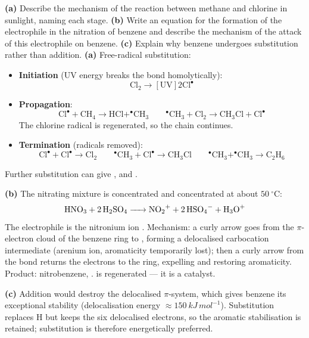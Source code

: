 \documentclass[11pt]{article}
\newcommand{\cle}[1]{{\popxbold\color{popdark}#1}}
\begin{document}
\begin{exoresolu}
\textbf{(a)} Describe the mechanism of the reaction between methane and chlorine in sunlight, naming each stage. \textbf{(b)} Write an equation for the formation of the electrophile in the nitration of benzene and describe the mechanism of the attack of this electrophile on benzene. \textbf{(c)} Explain why benzene undergoes substitution rather than addition.
\tcblower
\textbf{(a)} Free-radical substitution:
\begin{itemize}
\item \textbf{Initiation} (UV energy breaks the  bond homolytically):
\[ \ensuremath{\mathrm{Cl_{2} \rightarrow [UV] 2Cl^{\bullet}}} \]
\item \textbf{Propagation}:
\[ \ensuremath{\mathrm{Cl^{\bullet} + CH_{4} \rightarrow  HCl + ^{\bullet}CH_{3}}} \qquad \ensuremath{\mathrm{^{\bullet}CH_{3} + Cl_{2} \rightarrow  CH_{3}Cl + Cl^{\bullet}}} \]
The chlorine radical is regenerated, so the chain continues.
\item \textbf{Termination} (radicals removed):
\[ \ensuremath{\mathrm{Cl^{\bullet} + Cl^{\bullet} \rightarrow  Cl_{2}}} \qquad \ensuremath{\mathrm{^{\bullet}CH_{3} + Cl^{\bullet} \rightarrow  CH_{3}Cl}} \qquad \ensuremath{\mathrm{^{\bullet}CH_{3} + ^{\bullet}CH_{3} \rightarrow  C_{2}H_{6}}} \]
\end{itemize}
Further substitution can give ,  and .

\textbf{(b)} The nitrating mixture is concentrated  and concentrated  at about $\SI{50}{\ensuremath{{}^{\circ}\mathrm{C}}}$:
\[ \ce{HNO3 + 2H2SO4 -> NO2+ + 2HSO4- + H3O+} \]
The electrophile is the \cle{nitronium ion} . Mechanism: a curly arrow goes from the $\pi$-electron cloud of the benzene ring to , forming a delocalised carbocation intermediate (arenium ion, aromaticity temporarily lost); then a curly arrow from the  bond returns the electrons to the ring, expelling  and restoring aromaticity. Product: nitrobenzene, .  is regenerated — it is a catalyst.

\textbf{(c)} Addition would destroy the delocalised $\pi$-system, which gives benzene its exceptional stability (delocalisation energy $\approx \SI{150}{kJ\,mol^{-1}}$). Substitution replaces H but keeps the six delocalised electrons, so the aromatic stabilisation is retained; substitution is therefore energetically preferred.
\end{exoresolu}
\end{document}
